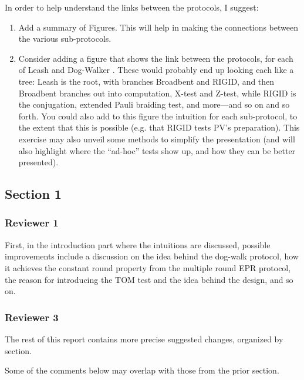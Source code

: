 \documentclass[12pt]{article}
\newcommand{\DW}{{\sf Dog-Walker }}
\newcommand{\Leash}{{\sf Leash }}
\newcommand{\Broad}{{\sf Broadbent }}
\begin{document}
In order to help understand the links between the protocols, I suggest:
\begin{enumerate}
\item Add a summary of Figures. This will help in making the connections between the various sub-protocols.
\item Consider adding a figure that shows the link between the protocols, for each of \Leash and \DW.  These would probably end up looking each like a tree: \Leash is the root, with branches \Broad and RIGID, and then \Broad branches out into computation, X-test and Z-test, while RIGID is the conjugation, extended Pauli braiding test, and more---and so on and so forth. You could also add to this figure the intuition for each sub-protocol, to the extent that this is possible (e.g. that RIGID tests PV's preparation). This exercise may also unveil some methods to simplify the presentation (and will also highlight where the ``ad-hoc'' tests show up, and how they can be better presented).
\end{enumerate}
	
\subsection*{Section 1}
\subsubsection*{Reviewer 1}
First, in the introduction part where the intuitions are discussed, possible improvements include a discussion on the idea behind the dog-walk protocol, how it achieves the constant round property from the multiple round EPR protocol, the reason for introducing the TOM test and the idea behind the design, and so on.

\subsubsection*{Reviewer 3}


The rest of this report contains more precise suggested changes, organized by section.

Some of the comments below may overlap with those from the prior section.
\end{document}
